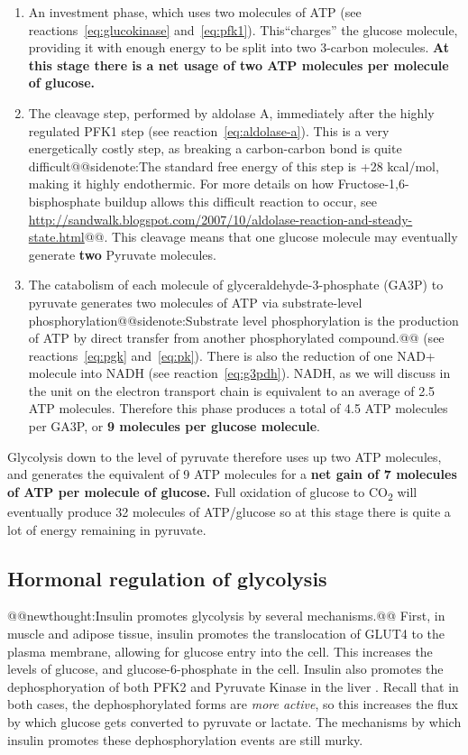 \documentclass{tufte-handout}
\makeatletter
\def\newthought#1{@@newthought:#1@@}
\def\sidenote#1{@@sidenote:#1@@}
\makeatother
\begin{document}
\begin{enumerate}
\item An investment phase, which uses two molecules of ATP (see reactions~\ref{eq:glucokinase} and~\ref{eq:pfk1}).  This``charges'' the glucose molecule, providing it with enough energy to be split into two 3-carbon molecules.  \textbf{At this stage there is a net usage of two ATP molecules per molecule of glucose.}
\item The cleavage step, performed by aldolase A, immediately after the highly regulated PFK1 step (see reaction~\ref{eq:aldolase-a}).  This is a very energetically costly step, as breaking a carbon-carbon bond is quite difficult\sidenote{The standard free energy of this step is +28 kcal/mol, making it highly endothermic.  For more details on how Fructose-1,6-bisphosphate buildup allows this difficult reaction to occur, see \url{http://sandwalk.blogspot.com/2007/10/aldolase-reaction-and-steady-state.html}}.  This cleavage means that one glucose molecule may eventually generate \textbf{two} Pyruvate molecules.
\item The catabolism of each molecule of glyceraldehyde-3-phosphate (GA3P) to pyruvate generates two molecules of ATP via substrate-level phosphorylation\sidenote{Substrate level phosphorylation is the production of ATP by direct transfer from another phosphorylated compound.} (see reactions~\ref{eq:pgk} and~\ref{eq:pk}).  There is also the reduction of one NAD+ molecule into NADH (see reaction~\ref{eq:g3pdh}).  NADH, as we will discuss in the unit on the electron transport chain is equivalent to an average of 2.5 ATP molecules.  Therefore this phase produces a total of 4.5 ATP molecules per GA3P, or \textbf{9 molecules per glucose molecule}.
\end{enumerate}

Glycolysis down to the level of pyruvate therefore uses up two ATP molecules, and generates the equivalent of 9 ATP molecules for a \textbf{net gain of 7 molecules of ATP per molecule of glucose.}  Full oxidation of glucose to CO\textsubscript{2} will eventually produce 32 molecules of ATP/glucose so at this stage there is quite a lot of energy remaining in pyruvate.

\subsection{Hormonal regulation of glycolysis}

\newthought{Insulin promotes glycolysis by several mechanisms.}  First, in muscle and adipose tissue, insulin promotes the translocation of GLUT4 to the plasma membrane, allowing for glucose entry into the cell.  This increases the levels of glucose, and glucose-6-phosphate in the cell.  Insulin also promotes the dephosphoryation of both PFK2 and Pyruvate Kinase in the liver \citep{PROBST1985}. Recall that in both cases, the dephosphorylated forms are \emph{more active}, so this increases the flux by which glucose gets converted to pyruvate or lactate.  The mechanisms by which insulin promotes these dephosphorylation events are still murky.
\end{document}

